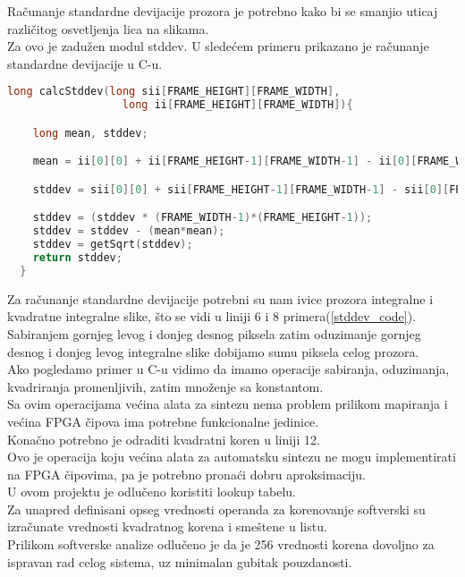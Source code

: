 Računanje standardne devijacije prozora je potrebno kako bi se smanjio uticaj
različitog osvetljenja lica na slikama. \\
Za ovo je zadužen modul stddev. U sledećem primeru prikazano je računanje
standardne devijacije u C-u.

\begin{lstlisting}[language=C++,caption={Primer računanja standardne devijacije u \textbf{C}-u},captionpos=b, label=stddev_code]
  long calcStddev(long sii[FRAME_HEIGHT][FRAME_WIDTH],
                  long ii[FRAME_HEIGHT][FRAME_WIDTH]){

    long mean, stddev;

    mean = ii[0][0] + ii[FRAME_HEIGHT-1][FRAME_WIDTH-1] - ii[0][FRAME_WIDTH-1] - ii[FRAME_HEIGHT-1][0];

    stddev = sii[0][0] + sii[FRAME_HEIGHT-1][FRAME_WIDTH-1] - sii[0][FRAME_WIDTH-1] - sii[FRAME_HEIGHT-1][0];

    stddev = (stddev * (FRAME_WIDTH-1)*(FRAME_HEIGHT-1));
    stddev = stddev - (mean*mean);
    stddev = getSqrt(stddev);
    return stddev;
  }
\end{lstlisting}

Za računanje standardne devijacije potrebni su nam ivice prozora integralne i
kvadratne integralne slike, što se vidi u liniji 6 i 8
primera(\ref{stddev_code}). \\
Sabiranjem gornjeg levog i donjeg desnog piksela zatim oduzimanje gornjeg desnog
i donjeg levog integralne slike dobijamo sumu piksela celog prozora. \\
Ako pogledamo primer u C-u vidimo da imamo operacije sabiranja, oduzimanja,
kvadriranja  promenljivih, zatim množenje sa konstantom. \\
Sa ovim operacijama većina alata za sintezu nema problem prilikom mapiranja i
većina FPGA čipova ima potrebne funkcionalne jedinice. \\

Konačno potrebno je odraditi kvadratni koren u liniji 12. \\
Ovo je operacija koju većina alata za automatsku sintezu ne mogu implementirati
na FPGA čipovima, pa je potrebno pronaći dobru aproksimaciju. \\

U ovom projektu je odlučeno koristiti lookup tabelu. \\
Za unapred definisani opseg vrednosti operanda za korenovanje softverski su
izračunate vrednosti kvadratnog korena i smeštene u listu. \\
Prilikom softverske analize odlučeno je da je 256 vrednosti korena dovoljno za ispravan
rad celog sistema, uz minimalan gubitak pouzdanosti. \\

